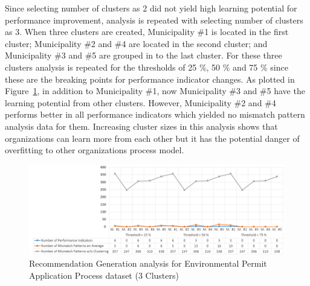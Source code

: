 Since selecting number of clusters as 2 did not yield high learning potential for performance improvement, analysis is repeated with selecting number of clusters as 3. When three clusters are created, Municipality \#1 is located in the first cluster; Municipality \#2 and \#4 are located in the second cluster; and Municipality \#3 and \#5 are grouped in to the last cluster. For these three clusters analysis is repeated for the thresholds of 25 \%, 50 \% and 75 \% since these are the breaking points for performance indicator changes. As plotted in Figure~\ref{fig:coselog-wabo-recommendation-generation-analysis-k3}, in addition to Municipality \#1, now Municipality \#3 and \#5 have the learning potential from other clusters. However, Municipality \#2 and \#4 performs better in all performance indicators which yielded no mismatch pattern analysis data for them. Increasing cluster sizes in this analysis shows that organizations can learn more from each other but it has the potential danger of overfitting to other organizations process model. 
\begin{figure}
	\centering
	\includegraphics[width=\textwidth]{5_results_discussions/coselog-wabo/recommendation-generation-analysis-k3}
	\caption{Recommendation Generation analysis for Environmental Permit Application Process dataset (3 Clusters)}
  \label{fig:coselog-wabo-recommendation-generation-analysis-k3}
\end{figure}
 